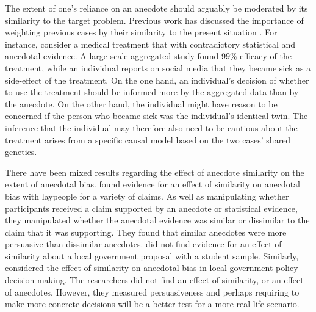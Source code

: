 \documentclass[a4paper, nobind, dvipsnames]{templates/ociamthesis}
\theoremstyle{definition}
\theoremstyle{definition}
\theoremstyle{definition}
\theoremstyle{definition}
\theoremstyle{remark}
\begin{document}
The extent of one's reliance on an anecdote should arguably be moderated by its
similarity to the target problem. Previous work has discussed the importance of
weighting previous cases by their similarity to the present situation
\autocite{gilboa1995,lovallo2012}. For instance, consider a medical treatment that
with contradictory statistical and anecdotal evidence. A large-scale aggregated
study found 99\% efficacy of the treatment, while an individual reports on social
media that they became sick as a side-effect of the treatment. On the one hand,
an individual's decision of whether to use the treatment should be informed more
by the aggregated data than by the anecdote. On the other hand, the individual
might have reason to be concerned if the person who became sick was the
individual's identical twin. The inference that the individual may therefore
also need to be cautious about the treatment arises from a specific causal model
based on the two cases' shared genetics.

There have been mixed results regarding the effect of anecdote similarity on the
extent of anecdotal bias. \textcite[Study 3]{hoeken2009} found evidence for an effect of
similarity on anecdotal bias with laypeople for a variety of claims. As well as
manipulating whether participants received a claim supported by an anecdote or
statistical evidence, they manipulated whether the anecdotal evidence was
similar or dissimilar to the claim that it was supporting. They found that
similar anecdotes were more persuasive than dissimilar anecdotes. \textcite{hoeken2001}
did not find evidence for an effect of similarity about a local government
proposal with a student sample. Similarly, \textcite{hornikx2018} considered the effect of
similarity on anecdotal bias in local government policy decision-making. The
researchers did not find an effect of similarity, or an effect of anecdotes.
However, they measured persuasiveness and perhaps requiring to make more
concrete decisions will be a better test for a more real-life scenario.
\end{document}
